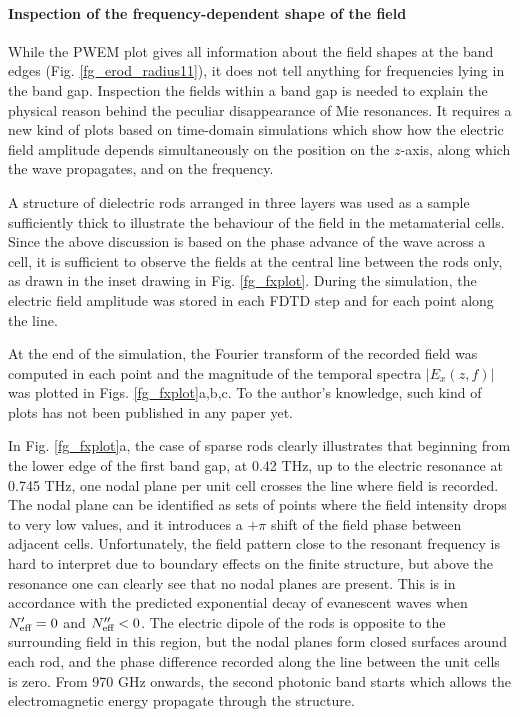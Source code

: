 \paragraph{Inspection of the frequency-dependent shape of the field}%
While the PWEM plot gives all information about the field shapes at the band edges (Fig. \ref{fg_erod_radius11}), it does not tell anything for frequencies lying in the band gap. Inspection the fields within a band gap  is needed to explain the physical reason behind the peculiar disappearance of Mie resonances. It requires a new kind of plots based on time-domain simulations which show how the electric field amplitude depends simultaneously on the position on the  $z$-axis, along which the wave propagates, and on the frequency.

A structure of dielectric rods arranged in three layers was used as a  sample sufficiently thick to illustrate the behaviour of the field in the metamaterial cells. Since the above discussion is based on the phase advance of the wave across a cell, it is sufficient to observe the fields at the central line between the rods only, as drawn in the inset drawing in Fig. \ref{fg_fxplot}.
During the simulation, the electric field amplitude was stored in each FDTD step and for each point along the line.

At the end of the simulation, the Fourier transform of the recorded field was computed in each point and the magnitude of the temporal spectra $|E_x(z, f)|$ was plotted in Figs. \ref{fg_fxplot}a,b,c. To the author's knowledge, such kind of plots has not been published in any paper yet. 

In Fig. \ref{fg_fxplot}a, the case of sparse rods clearly illustrates that beginning from the lower edge of the first band gap, at 0.42 THz, up to the electric resonance at 0.745 THz, one nodal plane per unit cell crosses the line where field is recorded. The nodal plane can be identified as sets of points where the field intensity drops to very low values, and it introduces a $+\pi$ shift of the field phase between adjacent cells. 
Unfortunately, the field pattern close to the resonant frequency is hard to interpret due to boundary effects on the finite structure, but above the resonance one can clearly see that no nodal planes are present. This is in accordance with the predicted exponential decay of evanescent waves when $N_{\text{eff} }' = 0$ and $N_{\text{eff} }'' < 0$. The electric dipole of the rods is opposite to the surrounding field in this region, but the nodal planes form closed surfaces around each rod, and the phase difference recorded along the line between the unit cells is zero. From 970 GHz onwards, the second photonic band starts which allows the electromagnetic energy propagate through the structure.


